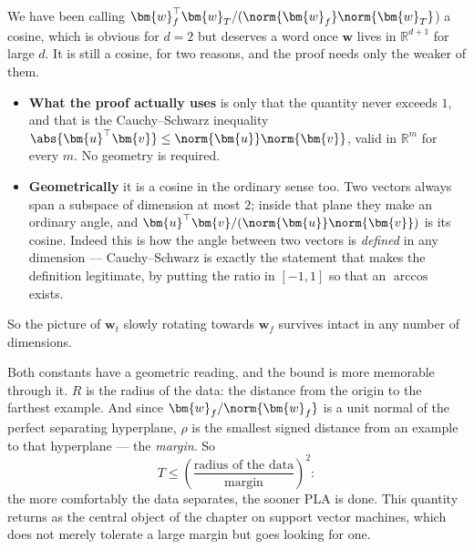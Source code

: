 \begin{remark}\label{rmk:cauchy}
    We have been calling
    \(\bm{w}_f^\top \bm{w}_T / (\norm{\bm{w}_f} \norm{\bm{w}_T}\)) a cosine,
    which is obvious for \(d = 2\) but deserves a word once \(\bm{w}\) lives in
    \(\mathbb{R}^{d+1}\) for large \(d\). It is still a cosine, for two
    reasons, and the proof needs only the weaker of them.
    \begin{itemize}
        \item \textbf{What the proof actually uses} is only that the quantity
            never exceeds \(1\), and that is the Cauchy--Schwarz inequality
            \(\abs{\bm{u}^\top \bm{v}} \le \norm{\bm{u}} \norm{\bm{v}}\), valid
            in \(\mathbb{R}^m\) for every \(m\). No geometry is required.
        \item \textbf{Geometrically} it is a cosine in the ordinary sense too.
            Two vectors always span a subspace of dimension at most \(2\); inside
            that plane they make an ordinary angle, and
            \(\bm{u}^\top \bm{v} / (\norm{\bm{u}} \norm{\bm{v}})\) is its cosine.
            Indeed this is how the angle between two vectors is \emph{defined}
            in any dimension --- Cauchy--Schwarz is exactly the statement that
            makes the definition legitimate, by putting the ratio in
            \([-1, 1]\) so that an \(\arccos\) exists.
    \end{itemize}
    So the picture of \(\bm{w}_t\) slowly rotating towards \(\bm{w}_f\) survives
    intact in any number of dimensions.
\end{remark}

\begin{remark}
    Both constants have a geometric reading, and the bound is more memorable
    through it. \(R\) is the radius of the data: the distance from the origin to
    the farthest example. And since \(\bm{w}_f / \norm{\bm{w}_f}\) is a unit
    normal of the perfect separating hyperplane, \(\rho\) is the smallest signed
    distance from an example to that hyperplane --- the \emph{margin}. So
    \[
        T \le \left( \frac{\text{radius of the data}}{\text{margin}} \right)^2 :
    \]
    the more comfortably the data separates, the sooner PLA is done. This
    quantity returns as the central object of the chapter on support vector
    machines, which does not merely tolerate a large margin but goes looking for
    one.
\end{remark}

